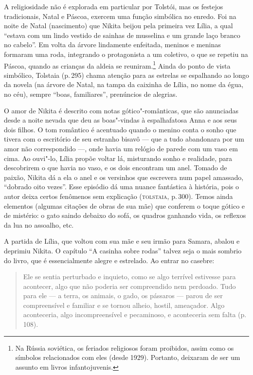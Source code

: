 A religiosidade não é explorada em particular por Tolstói, mas os
festejos tradicionais, Natal e Páscoa, exercem uma função simbólica no
enredo. Foi na noite de Natal (nascimento) que Nikita beijou pela
primeira vez Lília, a qual ``estava com um lindo vestido de sainhas de
musselina e um grande laço branco no cabelo''. Em volta da árvore
lindamente enfeitada, meninos e meninas formaram uma roda, integrando o
protagonista a um coletivo, o que se repetiu na Páscoa, quando as
crianças da aldeia se reuniram.\footnote{Na Rússia soviética, os
  feriados religiosos foram proibidos, assim como os símbolos
  relacionados com eles (desde 1929). Portanto, deixaram de ser um
  assunto em livros infantojuvenis.} Ainda do ponto de vista simbólico,
Tolstaia (p.\,295) chama atenção para as estrelas se espalhando ao longo
da novela (na árvore de Natal, na tampa da caixinha de Lília, no nome da
égua, no céu), sempre ``boas, familiares'', prenúncios de alegrias.

O amor de Nikita é descrito com notas gótico"-românticas, que são
anunciadas desde a noite nevada que deu as boas"-vindas à espalhafatosa
Anna e aos seus dois filhos. O tom romântico é acentuado quando o menino
conta o sonho que tivera com o escritório de seu estranho bisavô --- que
a tudo abandonara por um amor não correspondido ---, onde havia um
relógio de parede com um vaso em cima. Ao ouvi"-lo, Lília propõe voltar
lá, misturando sonho e realidade, para descobrirem o que havia no vaso,
e os dois encontram um anel. Tomado de paixão, Nikita dá a ela o anel e
os versinhos que escrevera num papel amassado, ``dobrado oito vezes''.
Esse episódio dá uma nuance fantástica à história, pois o autor deixa
certos fenômenos sem explicação (\textsc{tolstaia}, p.\,300). Temos ainda
elementos (algumas citações de obras de sua mãe) que conferem o toque
gótico e de mistério: o gato saindo debaixo do sofá, os quadros ganhando
vida, os reflexos da lua no assoalho, etc.

A partida de Lília, que voltou com sua mãe e seu irmão para Samara,
abalou e deprimiu Nikita. O capítulo ``A casinha sobre rodas'' talvez
seja o mais sombrio do livro, que é essencialmente alegre e estrelado.
Ao entrar no casebre:

\begin{quote}
Ele se sentia perturbado e inquieto, como se algo terrível estivesse
para acontecer, algo que não poderia ser compreendido nem perdoado. Tudo
para ele --- a terra, os animais, o gado, os pássaros --- parou de ser
compreensível e familiar e se tornou alheio, hostil, ameaçador. Algo
aconteceria, algo incompreensível e pecaminoso, e aconteceria sem falta
(p.\,108).
\end{quote}

